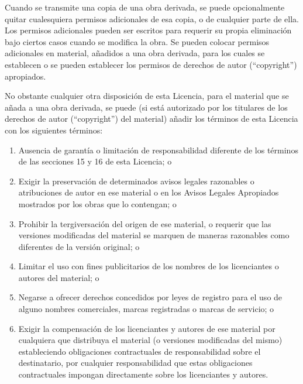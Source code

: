 \documentclass[11pt]{article}
\begin{document}
\begin{enumerate}
Cuando se transmite una copia de una obra derivada, se puede
opcionalmente quitar cualesquiera permisos adicionales de esa copia,
o de cualquier parte de ella. Los permisos adicionales pueden ser
escritos para requerir su propia eliminaci\'{o}n bajo ciertos casos cuando
se modifica la obra. Se pueden colocar permisos adicionales en material,
a\~nadidos a una obra derivada, para los cuales se establecen o se 
pueden establecer los permisos de derechos de autor (``copyright'') apropiados.

No obstante cualquier otra disposici\'{o}n de esta Licencia, para el
material que se a\~nada a una obra derivada, se puede (si est\'{a} autorizado
por los titulares de los derechos de autor (``copyright'') del material) a\~nadir los t\'{e}rminos de esta 
Licencia con los siguientes t\'{e}rminos:
  \begin{enumerate}
  \item Ausencia de garant\'{i}a o limitaci\'{o}n de responsabilidad diferente de 
    los t\'{e}rminos de las secciones 15 y 16 de esta Licencia; o

  \item Exigir la preservaci\'{o}n de determinados avisos legales razonables o
     atribuciones de autor en ese material o en los Avisos Legales 
     Apropiados mostrados por los obras que lo contengan; o

  \item Prohibir la tergiversaci\'{o}n del origen de ese material, o requerir 
    que las versiones modificadas del material se marquen de maneras 
    razonables como diferentes de la versi\'{o}n original; o

  \item Limitar el uso con fines publicitarios de los nombres de los 
    licenciantes o autores del material; o

  \item Negarse a ofrecer derechos concedidos por leyes de registro para el
    uso de alguno nombres comerciales, marcas registradas o marcas de servicio; o

  \item Exigir la compensaci\'{o}n de los licenciantes y autores de ese material por 
    cualquiera que distribuya el material (o versiones modificadas del mismo) 
    estableciendo obligaciones contractuales de responsabilidad sobre el 
    destinatario, por cualquier responsabilidad que estas obligaciones 
    contractuales impongan directamente sobre los licenciantes y autores.
  \end{enumerate}


\end{enumerate}
\end{document}
